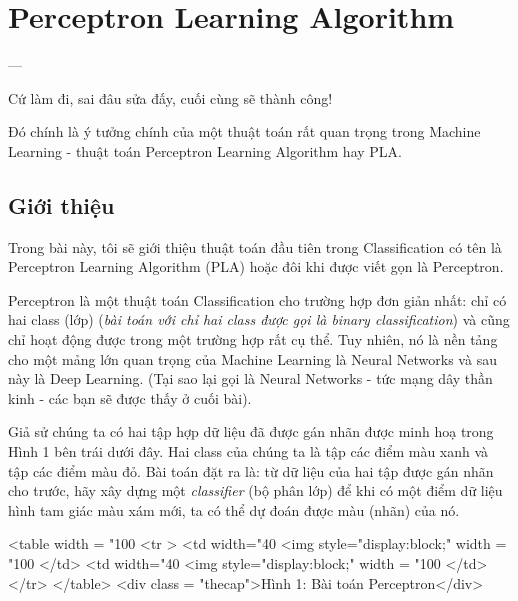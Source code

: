 \chapter{Perceptron Learning Algorithm}
--- 
 
Cứ làm đi, sai đâu sửa đấy, cuối cùng sẽ thành công! 
 
Đó chính là ý tưởng chính của một thuật toán rất quan trọng trong Machine Learning - thuật toán Perceptron Learning Algorithm hay PLA. 

 
\section{Giới thiệu}
 
Trong bài này, tôi sẽ giới thiệu thuật toán đầu tiên trong Classification có tên là Perceptron Learning Algorithm (PLA) hoặc đôi khi được viết gọn là Perceptron.  
 
Perceptron là một thuật toán Classification cho trường hợp đơn giản nhất: chỉ có hai class (lớp) (\textit{bài toán với chỉ hai class được gọi là binary classification}) và cũng chỉ hoạt động được trong một trường hợp rất cụ thể. Tuy nhiên, nó là nền tảng cho một mảng lớn quan trọng của Machine Learning là Neural Networks và sau này là Deep Learning. (Tại sao lại gọi là Neural Networks - tức mạng dây thần kinh - các bạn sẽ được thấy ở cuối bài). 
 
Giả sử chúng ta có hai tập hợp dữ liệu đã được gán nhãn được minh hoạ trong Hình 1 bên trái dưới đây. Hai class của chúng ta là tập các điểm màu xanh và tập các điểm màu đỏ. Bài toán đặt ra là: từ dữ liệu của hai tập được gán nhãn cho trước, hãy xây dựng một \textit{classifier} (bộ phân lớp) để khi có một điểm dữ liệu hình tam giác màu xám mới, ta có thể dự đoán được màu (nhãn) của nó.  
 
<table width = "100%
   <tr > 
        <td width="40%
        <img style="display:block;" width = "100%
         </td> 
        <td width="40%
        <img style="display:block;" width = "100%
        </td> 
    </tr> 
</table>  
<div class = "thecap">Hình 1: Bài toán Perceptron</div> 
 
